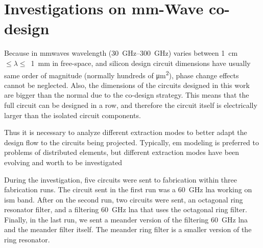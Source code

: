 \section{Investigations on mm-Wave co-design}

Because in \gls{mmwaves} wavelength (\SIrange{30}{300}{\giga\hertz}) varies between \SI{1}{\cm}~$\leq\lambda\leq$~\SI{1}{\mm} in free-space, and silicon design circuit dimensions have usually same order of magnitude (normally hundreds of \si{\square\micro\meter}), phase change effects cannot be neglected. Also, the dimensions of the circuits designed in this work are bigger than the normal due to the co-design strategy. This means that the full circuit can be designed in a row, and therefore the circuit itself is electrically larger than the isolated circuit components.  

Thus it is necessary to analyze different extraction modes to better adapt the design flow to the circuits being projected. Typically, \gls{em} modeling is preferred to problems of distributed elements, but different extraction modes have been evolving and worth to be investigated

During the investigation, five circuits were sent to fabrication within three fabrication runs. The circuit sent in the first run was a \SI{60}{\giga\hertz} \gls{lna} working on \gls{ism} band. After on the second run, two circuits were sent, an octagonal ring resonator filter, and a filtering \SI{60}{\giga\hertz} \gls{lna} that uses the octagonal ring filter. Finally, in the last run, we sent a meander version of the filtering \SI{60}{\giga\hertz} \gls{lna} and the meander filter itself. The meander ring filter is a smaller version of the ring resonator.

